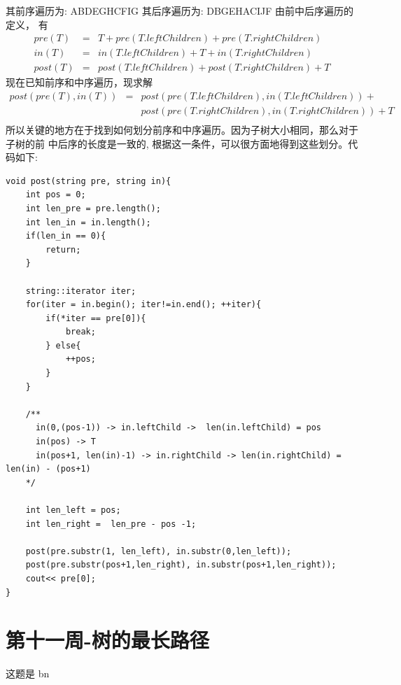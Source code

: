 \documentclass[utf-8]{ctexart}
\begin{document}
其前序遍历为: ABDEGHCFIG
其后序遍历为: DBGEHACIJF
由前中后序遍历的定义， 有
\begin{eqnarray}
pre(T)  &=& T +  pre(T.leftChildren) + pre(T.rightChildren)\\
 in(T)  &=& in(T.leftChildren) + T + in(T.rightChildren)   \\
post(T) &=& post(T.leftChildren)+post(T.rightChildren) + T
\end{eqnarray}
现在已知前序和中序遍历，现求解
\begin{eqnarray*}
  post(pre(T), in(T))  &=& post(pre(T.leftChildren), in(T.leftChildren)) + \\
                       & & post(pre(T.rightChildren), in(T.rightChildren)) + T \\
\end{eqnarray*}
所以关键的地方在于找到如何划分前序和中序遍历。因为子树大小相同，那么对于子树的前
中后序的长度是一致的, 根据这一条件，可以很方面地得到这些划分。代码如下:

\begin{lstlisting}
void post(string pre, string in){
    int pos = 0;
    int len_pre = pre.length();
    int len_in = in.length();
    if(len_in == 0){
        return;
    }

    string::iterator iter;
    for(iter = in.begin(); iter!=in.end(); ++iter){
        if(*iter == pre[0]){
            break;
        } else{
            ++pos;
        }
    }

    /**
      in(0,(pos-1)) -> in.leftChild ->  len(in.leftChild) = pos
      in(pos) -> T
      in(pos+1, len(in)-1) -> in.rightChild -> len(in.rightChild) = len(in) - (pos+1)
    */

    int len_left = pos;
    int len_right =  len_pre - pos -1;

    post(pre.substr(1, len_left), in.substr(0,len_left));
    post(pre.substr(pos+1,len_right), in.substr(pos+1,len_right));
    cout<< pre[0];
}
\end{lstlisting}

\section{第十一周-树的最长路径}
\label{sec:week_11}
这题是 bn
\end{document}
